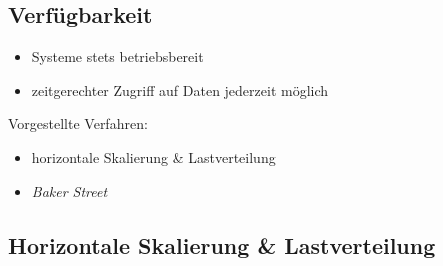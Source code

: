 \documentclass{beamer}
\begin{document}
\subsection{Verfügbarkeit}
\begin{frame}{\insertsubsection}
	\begin{itemize}
		\item Systeme stets betriebsbereit
		\item zeitgerechter Zugriff auf Daten jederzeit möglich
	\end{itemize}
	\vspace*{1cm}
	\pause
	Vorgestellte Verfahren:
	\begin{itemize}
		\item horizontale Skalierung \& Lastverteilung
		\item \textit{Baker Street}
	\end{itemize}
\end{frame}


\subsection{Horizontale Skalierung \& Lastverteilung}
\end{document}
